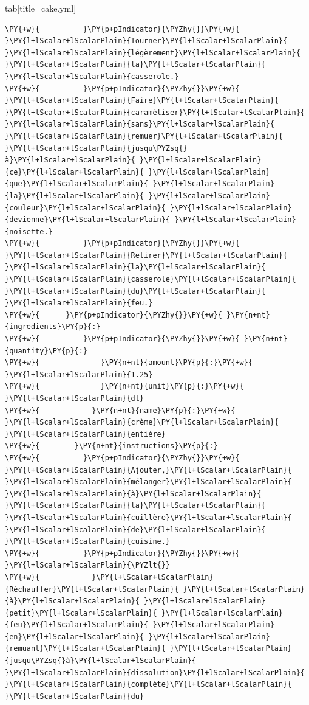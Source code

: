 \documentclass[a4paper,twoside]{article}
\begin{document}
\begin{tsdiv}{tab}[title=cake.yml]
\begin{tscode}[lang=yaml, engine=pygments]
\begin{Verbatim}[commandchars=\\\{\},breaklines, breakanywhere, commandchars=\\\{\}]
\PY{+w}{          }\PY{p+pIndicator}{\PYZhy{}}\PY{+w}{ }\PY{l+lScalar+lScalarPlain}{Tourner}\PY{l+lScalar+lScalarPlain}{ }\PY{l+lScalar+lScalarPlain}{légèrement}\PY{l+lScalar+lScalarPlain}{ }\PY{l+lScalar+lScalarPlain}{la}\PY{l+lScalar+lScalarPlain}{ }\PY{l+lScalar+lScalarPlain}{casserole.}
\PY{+w}{          }\PY{p+pIndicator}{\PYZhy{}}\PY{+w}{ }\PY{l+lScalar+lScalarPlain}{Faire}\PY{l+lScalar+lScalarPlain}{ }\PY{l+lScalar+lScalarPlain}{caraméliser}\PY{l+lScalar+lScalarPlain}{ }\PY{l+lScalar+lScalarPlain}{sans}\PY{l+lScalar+lScalarPlain}{ }\PY{l+lScalar+lScalarPlain}{remuer}\PY{l+lScalar+lScalarPlain}{ }\PY{l+lScalar+lScalarPlain}{jusqu\PYZsq{}à}\PY{l+lScalar+lScalarPlain}{ }\PY{l+lScalar+lScalarPlain}{ce}\PY{l+lScalar+lScalarPlain}{ }\PY{l+lScalar+lScalarPlain}{que}\PY{l+lScalar+lScalarPlain}{ }\PY{l+lScalar+lScalarPlain}{la}\PY{l+lScalar+lScalarPlain}{ }\PY{l+lScalar+lScalarPlain}{couleur}\PY{l+lScalar+lScalarPlain}{ }\PY{l+lScalar+lScalarPlain}{devienne}\PY{l+lScalar+lScalarPlain}{ }\PY{l+lScalar+lScalarPlain}{noisette.}
\PY{+w}{          }\PY{p+pIndicator}{\PYZhy{}}\PY{+w}{ }\PY{l+lScalar+lScalarPlain}{Retirer}\PY{l+lScalar+lScalarPlain}{ }\PY{l+lScalar+lScalarPlain}{la}\PY{l+lScalar+lScalarPlain}{ }\PY{l+lScalar+lScalarPlain}{casserole}\PY{l+lScalar+lScalarPlain}{ }\PY{l+lScalar+lScalarPlain}{du}\PY{l+lScalar+lScalarPlain}{ }\PY{l+lScalar+lScalarPlain}{feu.}
\PY{+w}{      }\PY{p+pIndicator}{\PYZhy{}}\PY{+w}{ }\PY{n+nt}{ingredients}\PY{p}{:}
\PY{+w}{          }\PY{p+pIndicator}{\PYZhy{}}\PY{+w}{ }\PY{n+nt}{quantity}\PY{p}{:}
\PY{+w}{              }\PY{n+nt}{amount}\PY{p}{:}\PY{+w}{ }\PY{l+lScalar+lScalarPlain}{1.25}
\PY{+w}{              }\PY{n+nt}{unit}\PY{p}{:}\PY{+w}{ }\PY{l+lScalar+lScalarPlain}{dl}
\PY{+w}{            }\PY{n+nt}{name}\PY{p}{:}\PY{+w}{ }\PY{l+lScalar+lScalarPlain}{crème}\PY{l+lScalar+lScalarPlain}{ }\PY{l+lScalar+lScalarPlain}{entière}
\PY{+w}{        }\PY{n+nt}{instructions}\PY{p}{:}
\PY{+w}{          }\PY{p+pIndicator}{\PYZhy{}}\PY{+w}{ }\PY{l+lScalar+lScalarPlain}{Ajouter,}\PY{l+lScalar+lScalarPlain}{ }\PY{l+lScalar+lScalarPlain}{mélanger}\PY{l+lScalar+lScalarPlain}{ }\PY{l+lScalar+lScalarPlain}{à}\PY{l+lScalar+lScalarPlain}{ }\PY{l+lScalar+lScalarPlain}{la}\PY{l+lScalar+lScalarPlain}{ }\PY{l+lScalar+lScalarPlain}{cuillère}\PY{l+lScalar+lScalarPlain}{ }\PY{l+lScalar+lScalarPlain}{de}\PY{l+lScalar+lScalarPlain}{ }\PY{l+lScalar+lScalarPlain}{cuisine.}
\PY{+w}{          }\PY{p+pIndicator}{\PYZhy{}}\PY{+w}{ }\PY{l+lScalar+lScalarPlain}{\PYZlt{}}
\PY{+w}{            }\PY{l+lScalar+lScalarPlain}{Réchauffer}\PY{l+lScalar+lScalarPlain}{ }\PY{l+lScalar+lScalarPlain}{à}\PY{l+lScalar+lScalarPlain}{ }\PY{l+lScalar+lScalarPlain}{petit}\PY{l+lScalar+lScalarPlain}{ }\PY{l+lScalar+lScalarPlain}{feu}\PY{l+lScalar+lScalarPlain}{ }\PY{l+lScalar+lScalarPlain}{en}\PY{l+lScalar+lScalarPlain}{ }\PY{l+lScalar+lScalarPlain}{remuant}\PY{l+lScalar+lScalarPlain}{ }\PY{l+lScalar+lScalarPlain}{jusqu\PYZsq{}à}\PY{l+lScalar+lScalarPlain}{ }\PY{l+lScalar+lScalarPlain}{dissolution}\PY{l+lScalar+lScalarPlain}{ }\PY{l+lScalar+lScalarPlain}{complète}\PY{l+lScalar+lScalarPlain}{ }\PY{l+lScalar+lScalarPlain}{du}

\end{Verbatim}
\end{tscode}
\end{tsdiv}
\end{document}
